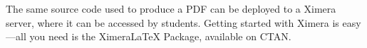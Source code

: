 \documentclass{article}
\begin{document}
\begin{multicols}{2}
\begin{xframe}
\begin{center}
        \end{center}
        The same source code used to produce a PDF can be deployed to a Ximera
        server, where it can be accessed by students. Getting started with
        Ximera
        is
        easy---all you need is the XimeraLaTeX Package, available on CTAN.
    \end{xframe}


\end{multicols}
\end{document}
